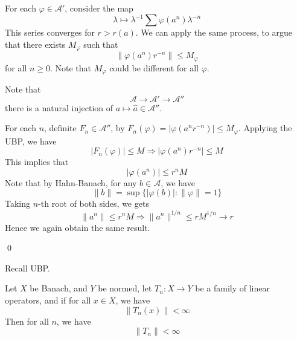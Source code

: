 For each $\varphi\in\mathcal{A}'$, consider the map
\begin{equation*}
    \lambda\mapsto\lambda^{-1}\sum\varphi(a^n)\lambda^{-n}
\end{equation*}
This series converges for $r>r(a)$.
We can apply the same process, to argue that there exists $M_\varphi$ such that
\begin{equation*}
    \|\varphi(a^n)r^{-n}\|\leq M_\varphi
\end{equation*}
for all $n\geq 0$. Note that $M_\varphi$ could be different for all $\varphi$. 

Note that 
\begin{equation*}
    \mathcal{A}\to \mathcal{A}'\to \mathcal{A}''
\end{equation*}
there is a natural injection of $a\mapsto\widehat{a}\in\mathcal{A}''$.

For each $n$, definite $F_n\in\mathcal{A}''$, by $F_n(\varphi)=|\varphi(a^nr^{-n})|\leq M_\varphi$. Applying the UBP, we have
\begin{equation*}
    |F_n(\varphi)|\leq M\Rightarrow |\varphi(a^n)r^{-n}|\leq M
\end{equation*}
This implies that 
\begin{equation*}
    |\varphi(a^n)|\leq r^nM
\end{equation*}
Note that by Hahn-Banach, for any $b\in\mathcal{A}$, we have
\begin{equation*}
    \|b\|=\sup\{|\varphi(b)|:\|\varphi\|=1\}
\end{equation*}
Taking $n$-th root of both sides, we gets
\begin{equation*}
    \|a^n\|\leq r^nM\Rightarrow \|a^n\|^{1/n}\leq rM^{1/n}\to r
\end{equation*}
Hence we again obtain the same result.

\qed



Recall UBP.
\begin{theorem}
    Let $X$ be Banach, and $Y$ be normed, let $T_n:X\to Y$ be a family of linear operators, and if for all $x\in X$, we have
    \begin{equation*}
        \|T_n(x)\|<\infty
    \end{equation*}
    Then for all $n$, we have
    \begin{equation*}
        \|T_n\|<\infty
    \end{equation*}
\end{theorem}

